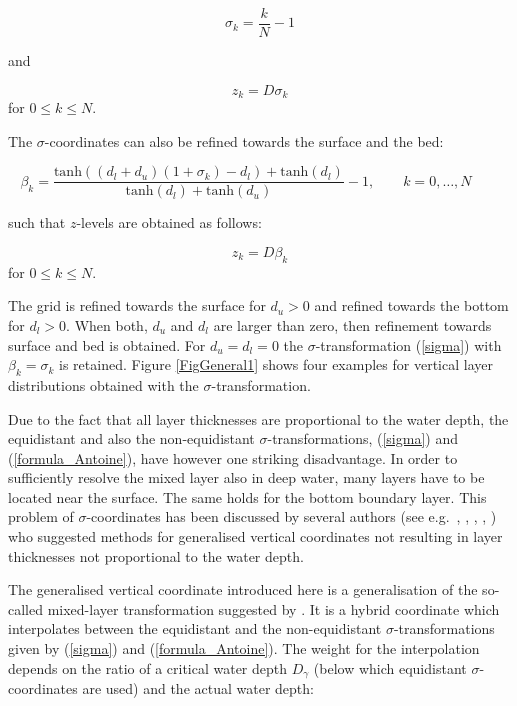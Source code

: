 \begin{equation}\label{sigma}
\sigma_k=\frac{k}{N}-1 
\end{equation}

and 

\begin{equation}\label{sigmaz}
z_k=D\sigma_k 
\end{equation}
for $0\leq k\leq N$.

The $\sigma$-coordinates can also be refined towards the surface and the
bed:

\begin{equation}\label{formula_Antoine}
\beta_k = \frac{\mbox{tanh}\left( (d_l+d_u)(1+\sigma_k)-d_l\right)
+\mbox{tanh}(d_l)}{\mbox{tanh}(d_l)+\mbox{tanh}(d_u)}-1,
\qquad k=0,\dots,N\qquad
\end{equation}

such that $z$-levels are obtained as follows:

\begin{equation}
z_k=D\beta_k 
\end{equation}
for $0\leq k\leq N$.

The grid is refined towards the surface for $d_u>0$ and refined towards
the bottom for $d_l>0$. When both, $d_u$ and $d_l$ are larger than zero,
then refinement towards surface and bed is obtained. For 
$d_u=d_l=0$ the $\sigma$-transformation (\ref{sigma}) with
$\beta_k=\sigma_k$ is retained. 
Figure \ref{FigGeneral1} shows four examples for vertical layer
distributions obtained with the $\sigma$-transformation. 

Due to the fact that all layer thicknesses are proportional to
the water depth, 
the equidistant and also the non-equidistant $\sigma$-transformations,
(\ref{sigma}) and (\ref{formula_Antoine}), 
have however one striking disadvantage. In order to 
sufficiently resolve the mixed layer also in deep water, many
layers have to be located near the surface. 
The same holds for the bottom boundary layer. 
This problem of $\sigma$-coordinates has been discussed by
several authors (see e.g.\ \cite{DELEERSNIJDERea92}, \cite{KOK92},
\cite{GERDES93}, \cite{SONGea94},
\cite{BURCHARDea97}) who suggested methods
for generalised vertical coordinates not resulting in layer 
thicknesses not proportional to the water depth. 

The generalised vertical coordinate introduced here is a
generalisation of the so-called mixed-layer transformation
suggested by \cite{BURCHARDea97}. It is a hybrid coordinate which
interpolates between the equidistant and the
non-equidistant $\sigma$-transformations given by 
(\ref{sigma}) and (\ref{formula_Antoine}). The weight for the interpolation
depends on the ratio of a critical water depth $D_{\gamma}$ (below which
equidistant $\sigma$-coordinates are used) and the actual water depth:

